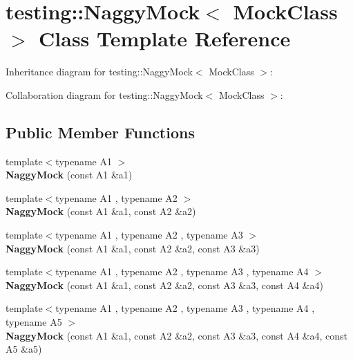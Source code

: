 \hypertarget{classtesting_1_1NaggyMock}{}\section{testing\+:\+:Naggy\+Mock$<$ Mock\+Class $>$ Class Template Reference}
\label{classtesting_1_1NaggyMock}


Inheritance diagram for testing\+:\+:Naggy\+Mock$<$ Mock\+Class $>$\+:


Collaboration diagram for testing\+:\+:Naggy\+Mock$<$ Mock\+Class $>$\+:
\subsection*{Public Member Functions}
\begin{DoxyCompactItemize}
\item 
\mbox{\label{classtesting_1_1NaggyMock_ae43ea6c6a6b66fe31cb14f93e0be5718}} 
{\footnotesize template$<$typename A1 $>$ }\\{\bfseries Naggy\+Mock} (const A1 \&a1)
\item 
\mbox{\label{classtesting_1_1NaggyMock_a4241363ab2ca3a2e7baa5ead980175e6}} 
{\footnotesize template$<$typename A1 , typename A2 $>$ }\\{\bfseries Naggy\+Mock} (const A1 \&a1, const A2 \&a2)
\item 
\mbox{\label{classtesting_1_1NaggyMock_abd9eea0573bf39f4b41504b2d1df5311}} 
{\footnotesize template$<$typename A1 , typename A2 , typename A3 $>$ }\\{\bfseries Naggy\+Mock} (const A1 \&a1, const A2 \&a2, const A3 \&a3)
\item 
\mbox{\label{classtesting_1_1NaggyMock_aa7d63f62600171db931c6bbb4c2a6d52}} 
{\footnotesize template$<$typename A1 , typename A2 , typename A3 , typename A4 $>$ }\\{\bfseries Naggy\+Mock} (const A1 \&a1, const A2 \&a2, const A3 \&a3, const A4 \&a4)
\item 
\mbox{\label{classtesting_1_1NaggyMock_ac751c8a708935bd8558c9665160f7144}} 
{\footnotesize template$<$typename A1 , typename A2 , typename A3 , typename A4 , typename A5 $>$ }\\{\bfseries Naggy\+Mock} (const A1 \&a1, const A2 \&a2, const A3 \&a3, const A4 \&a4, const A5 \&a5)

\end{DoxyCompactItemize}
